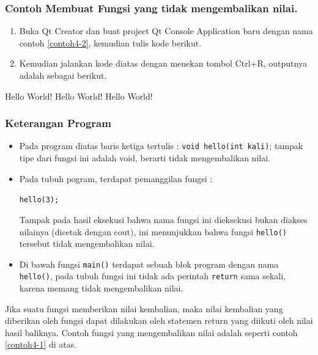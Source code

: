\subsubsection*{Contoh Membuat Fungsi yang tidak mengembalikan nilai.}

\begin{enumerate}

\item
 Buka Qt Creator dan buat project Qt Console Application baru dengan
 nama contoh \ref{contoh4-2}, kemudian tulis kode berikut.



\item
 Kemudian jalankan kode diatas dengan menekan tombol Ctrl+R, outputnya
 adalah sebagai berikut.
\end{enumerate}
\begin{lcverbatim}
Hello World!
Hello World!
Hello World!
\end{lcverbatim}


\subsubsection*{Keterangan Program}

\begin{itemize}
\item
 Pada program diatas baris ketiga tertulis :
 \texttt{void\ hello(int\ kali)}; tampak tipe dari fungsi ini adalah
 void, berarti tidak mengembalikan nilai.
\item
 Pada tubuh pogram, terdapat pemanggilan fungsi :


\texttt{hello(3);}

Tampak pada hasil eksekusi bahwa nama fungsi ini dieksekusi bukan
diakses nilainya (dicetak dengan cout), ini menunjukkan bahwa fungsi
\texttt{hello()} tersebut tidak mengembalikan nilai.


\item
 Di bawah fungsi \texttt{main()} terdapat sebuah blok program dengan
 nama \texttt{hello()}, pada tubuh fungsi ini tidak ada perintah
 \texttt{return} sama sekali, karena memang tidak mengembalikan nilai.
\end{itemize}

Jika suatu fungsi memberikan nilai kembalian, maka nilai kembalian yang
diberikan oleh fungsi dapat dilakukan oleh statemen return yang diikuti
oleh nilai hasil baliknya. Contoh fungsi yang mengembalikan nilai adalah
seperti contoh \ref{contoh4-1} di atas.

